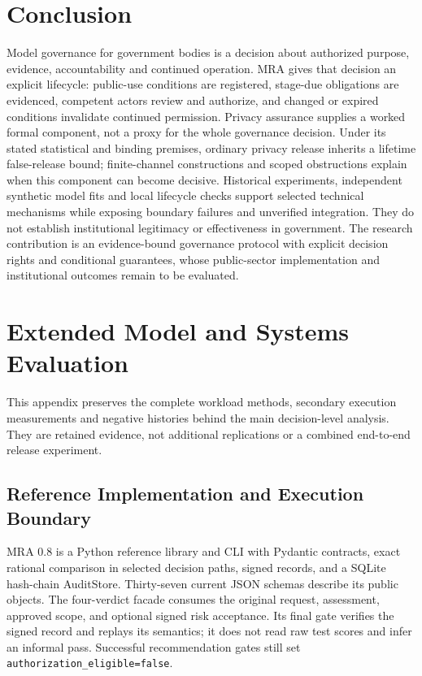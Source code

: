 \documentclass[conference,compsoc]{IEEEtran}
\newcommand{\code}[1]{\texttt{\small #1}}
\begin{document}
\section{Conclusion}
Model governance for government bodies is a decision about authorized
purpose, evidence, accountability and continued operation. MRA gives that
decision an explicit lifecycle: public-use conditions are registered,
stage-due obligations are evidenced, competent actors review and authorize,
and changed or expired conditions invalidate continued permission.
Privacy assurance supplies a worked formal component, not a proxy for the
whole governance decision. Under its stated statistical and binding
premises, ordinary privacy release inherits a lifetime false-release bound;
finite-channel constructions and scoped obstructions explain when this
component can become decisive. Historical experiments, independent synthetic
model fits and local lifecycle checks support selected technical mechanisms
while exposing boundary failures and unverified integration. They do not
establish institutional legitimacy or effectiveness in government. The research contribution is an
evidence-bound governance protocol with explicit decision rights and
conditional guarantees, whose public-sector implementation and institutional
outcomes remain to be evaluated.

\clearpage


\appendices





\section{Extended Model and Systems Evaluation}
\label{app:extended-evaluation}
This appendix preserves the complete workload methods, secondary execution
measurements and negative histories behind the main decision-level analysis.
They are retained evidence, not additional replications or a combined
end-to-end release experiment.

\subsection{Reference Implementation and Execution Boundary}

MRA 0.8 is a Python reference library and CLI with Pydantic contracts, exact
rational comparison in selected decision paths, signed records, and a SQLite
hash-chain AuditStore. Thirty-seven current JSON schemas describe its public
objects. The four-verdict facade consumes the original request, assessment,
approved scope, and optional signed risk acceptance. Its final gate verifies
the signed record and replays its semantics; it does not read raw test scores
and infer an informal pass. Successful recommendation gates still set
\code{authorization\_eligible=false}.
\end{document}
